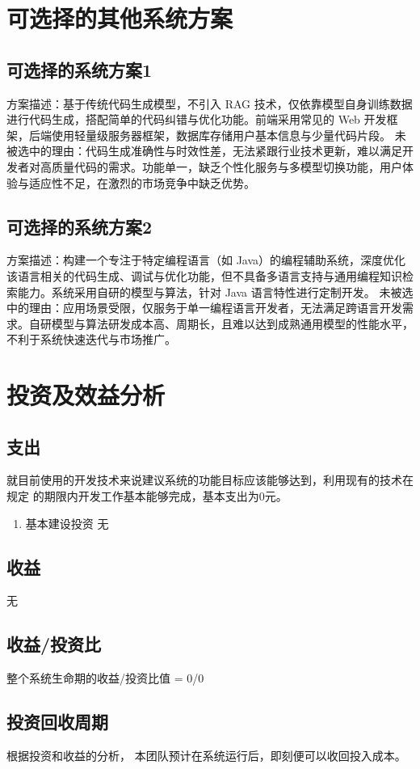 \documentclass[
    report,     %
    oneside,    %
    UTF8,       %
    zihao=-4    %
]{config} %
\begin{document}
\section{可选择的其他系统方案}
\subsection{可选择的系统方案1}
方案描述：基于传统代码生成模型，不引入 RAG 技术，仅依靠模型自身训练数据进行代码生成，搭配简单的代码纠错与优化功能。前端采用常见的 Web 开发框架，后端使用轻量级服务器框架，数据库存储用户基本信息与少量代码片段。
未被选中的理由：代码生成准确性与时效性差，无法紧跟行业技术更新，难以满足开发者对高质量代码的需求。功能单一，缺乏个性化服务与多模型切换功能，用户体验与适应性不足，在激烈的市场竞争中缺乏优势。
\subsection{可选择的系统方案2}
方案描述：构建一个专注于特定编程语言（如 Java）的编程辅助系统，深度优化该语言相关的代码生成、调试与优化功能，但不具备多语言支持与通用编程知识检索能力。系统采用自研的模型与算法，针对 Java 语言特性进行定制开发。
未被选中的理由：应用场景受限，仅服务于单一编程语言开发者，无法满足跨语言开发需求。自研模型与算法研发成本高、周期长，且难以达到成熟通用模型的性能水平，不利于系统快速迭代与市场推广。
\section{投资及效益分析}
\subsection{支出}
就目前使用的开发技术来说建议系统的功能目标应该能够达到，利用现有的技术在规定
的期限内开发工作基本能够完成，基本支出为0元。
\begin{enumerate}[label=(\arabic*)]
    \item 基本建设投资
    无
\end{enumerate}
\subsection{收益}
无
\subsection{收益/投资比}
整个系统生命期的收益/投资比值 = 0/0
\subsection{投资回收周期}
根据投资和收益的分析， 本团队预计在系统运行后，即刻便可以收回投入成本。
\end{document}
